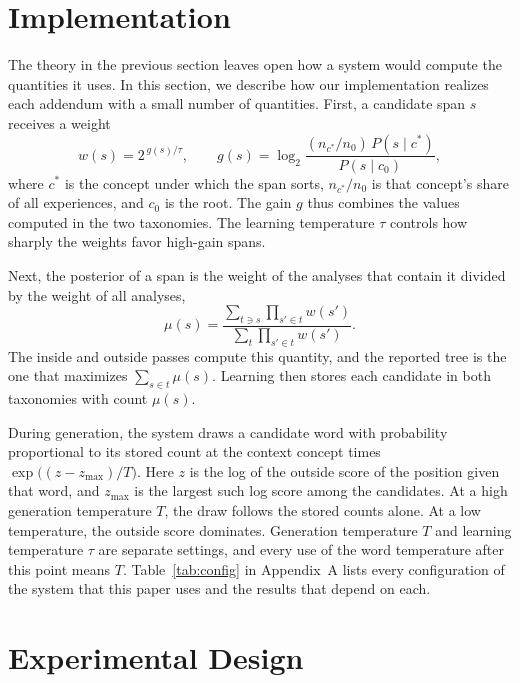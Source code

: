\documentclass[11pt,letterpaper]{article}
\begin{document}
\section{Implementation}

The theory in the previous section leaves open how a system would compute the quantities it uses. In this section, we describe how our implementation realizes each addendum with a small number of quantities. First, a candidate span $s$ receives a weight
\begin{equation}
w(s) = 2^{\,g(s)/\tau}, \qquad g(s) = \log_2 \frac{(n_{c^*}/n_0)\,P(s \mid c^*)}{P(s \mid c_0)},
\label{eq:weight}
\end{equation}
where $c^*$ is the concept under which the span sorts, $n_{c^*}/n_0$ is that concept's share of all experiences, and $c_0$ is the root.
The gain $g$ thus combines the values computed in the two taxonomies. The learning temperature $\tau$ controls how sharply the weights favor high-gain spans.

Next, the posterior of a span is the weight of the analyses that contain it divided by the weight of all analyses,
\begin{equation}
\mu(s) = \frac{\sum_{t \ni s} \prod_{s' \in t} w(s')}{\sum_{t} \prod_{s' \in t} w(s')}.
\label{eq:posterior}
\end{equation}
The inside and outside passes compute this quantity, and the reported tree is the one that maximizes $\sum_{s \in t} \mu(s)$.
Learning then stores each candidate in both taxonomies with count $\mu(s)$.

During generation, the system draws a candidate word with probability proportional to its stored count at the context concept times
$\exp\bigl((z-z_{\max})/T\bigr)$. Here $z$ is the log of the outside score of the position given that word, and $z_{\max}$ is the largest such log score among the candidates.
At a high generation temperature $T$, the draw follows the stored counts alone. At a low temperature, the outside score dominates.
Generation temperature $T$ and learning temperature $\tau$ are separate settings, and every use of the word temperature after this point means $T$.
Table~\ref{tab:config} in Appendix~A lists every configuration of the system that this paper uses and the results that depend on each.

\section{Experimental Design}
\label{sec:design}
\end{document}
